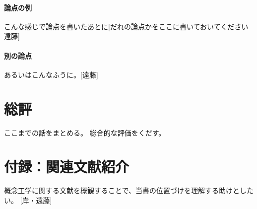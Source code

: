 \documentclass[dvipdfmx,autodetect-engine]{jsarticle}
\begin{document}
\paragraph{論点の例}
こんな感じで論点を書いたあとに[だれの論点かをここに書いておいてください　遠藤]

\paragraph{別の論点}
あるいはこんなふうに。[遠藤]

\paragraph{}

\section{総評}
ここまでの話をまとめる。
総合的な評価をくだす。


\section*{付録：関連文献紹介}
概念工学に関する文献を概観することで、当書の位置づけを理解する助けとしたい。
[岸・遠藤]

\printbibliography
\end{document}
